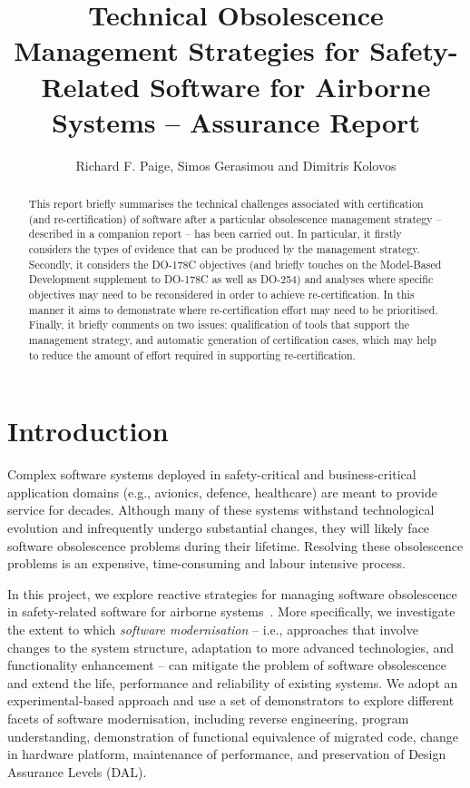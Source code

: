 \documentclass{llncs}
\begin{document}
\title{Technical Obsolescence Management Strategies for Safety-Related Software for Airborne Systems -- Assurance Report}

\author{Richard F. Paige, Simos Gerasimou and Dimitris Kolovos}

\maketitle

\begin{abstract}
This report briefly summarises the technical challenges associated with certification (and re-certification)
of software after a particular obsolescence management strategy -- described in a companion report -- has
been carried out. In particular, it firstly considers the types of evidence that can
be produced by the management strategy. Secondly, it considers the DO-178C objectives (and briefly touches on the Model-Based Development supplement to DO-178C as well as DO-254) and analyses where specific objectives
may need to be reconsidered in order to achieve re-certification. In this manner it aims to demonstrate where
re-certification effort may need to be prioritised. Finally, it briefly comments on two issues: qualification of tools that support
the management strategy, and automatic generation of certification cases, which may help to reduce the amount of effort 
required in supporting re-certification.
\end{abstract}

\section{Introduction}
Complex software systems deployed in safety-critical and business-critical 
application domains (e.g., avionics, defence, healthcare) are meant to provide 
service for decades. Although many of these systems withstand technological 
evolution and infrequently undergo substantial changes, they will likely face 
software obsolescence problems during their lifetime. 
Resolving these obsolescence problems is an expensive, time-consuming and 
labour intensive process.

In this project, we explore reactive strategies for managing software 
obsolescence in safety-related software for airborne 
systems~\cite{ProjectResponse}. More specifically, we 
investigate the extent to which \textit{software modernisation} -- i.e., 
approaches that involve changes to the system 
structure, adaptation to more advanced technologies, and functionality 
enhancement -- can mitigate the problem of software obsolescence and extend the 
life, performance and reliability of existing systems. We adopt an 
experimental-based approach and use a set of demonstrators to explore different 
facets of software modernisation, 
including reverse engineering, program understanding, demonstration of 
functional equivalence of 
migrated code, change in hardware platform, maintenance of performance, and 
preservation of Design Assurance Levels (DAL).
\end{document}
